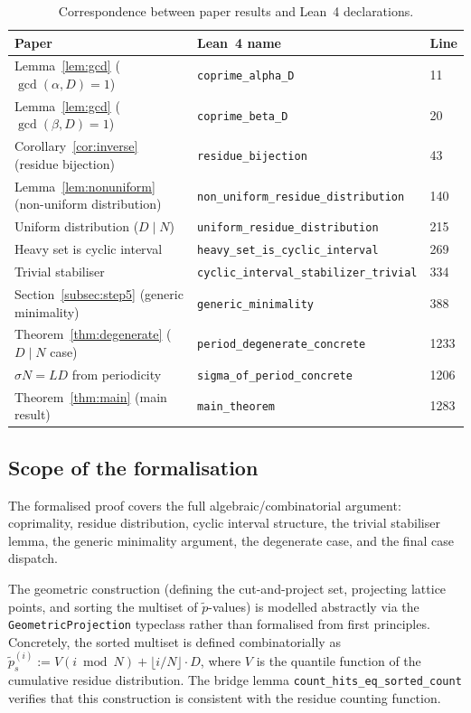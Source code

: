 \documentclass[11pt]{article}
\theoremstyle{plain}
\theoremstyle{definition}
\theoremstyle{remark}
\begin{document}
\begin{table}[ht]
\centering
\small
\begin{tabular}{lll}
\hline
\textbf{Paper} & \textbf{Lean~4 name} & \textbf{Line} \\
\hline
Lemma~\ref{lem:gcd} ($\gcd(\alpha,D)=1$)
  & \texttt{coprime\_alpha\_D} & 11 \\
Lemma~\ref{lem:gcd} ($\gcd(\beta,D)=1$)
  & \texttt{coprime\_beta\_D} & 20 \\
Corollary~\ref{cor:inverse} (residue bijection)
  & \texttt{residue\_bijection} & 43 \\
Lemma~\ref{lem:nonuniform} (non-uniform distribution)
  & \texttt{non\_uniform\_residue\_distribution} & 140 \\
Uniform distribution ($D \mid N$)
  & \texttt{uniform\_residue\_distribution} & 215 \\
Heavy set is cyclic interval
  & \texttt{heavy\_set\_is\_cyclic\_interval} & 269 \\
Trivial stabiliser
  & \texttt{cyclic\_interval\_stabilizer\_trivial} & 334 \\
Section~\ref{subsec:step5} (generic minimality)
  & \texttt{generic\_minimality} & 388 \\
Theorem~\ref{thm:degenerate} ($D \mid N$ case)
  & \texttt{period\_degenerate\_concrete} & 1233 \\
$\sigma N = LD$ from periodicity
  & \texttt{sigma\_of\_period\_concrete} & 1206 \\
Theorem~\ref{thm:main} (main result)
  & \texttt{main\_theorem} & 1283 \\
\hline
\end{tabular}
\caption{Correspondence between paper results and Lean~4 declarations.}
\label{tab:lean}
\end{table}

\subsection{Scope of the formalisation}\label{subsec:lean_scope}

The formalised proof covers the full algebraic/combinatorial argument:
coprimality, residue distribution, cyclic interval structure, the
trivial stabiliser lemma, the generic minimality argument, the
degenerate case, and the final case dispatch.

The geometric construction (defining the cut-and-project set,
projecting lattice points, and sorting the multiset of
$\tilde{p}$-values) is modelled abstractly via the
\texttt{GeometricProjection} typeclass rather than formalised from
first principles.  Concretely, the sorted multiset is defined
combinatorially as $\tilde{p}^{(i)}_s := V(i \bmod N) + \lfloor i/N
\rfloor \cdot D$, where $V$ is the quantile function of the
cumulative residue distribution.  The bridge lemma
\texttt{count\_hits\_eq\_sorted\_count} verifies that this
construction is consistent with the residue counting function.
\end{document}
